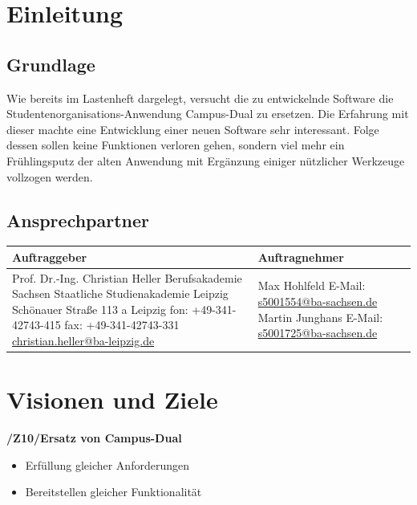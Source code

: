 \documentclass[12pt, a4paper]{scrartcl}
\newcommand{\ford}[2]{\textbf{/#1/\hspace{2em}#2}}
\begin{document}
\section{Einleitung}
\subsection{Grundlage}
Wie bereits im Lastenheft dargelegt, versucht die zu entwickelnde Software die Studentenorganisations-Anwendung Campus-Dual zu ersetzen. Die Erfahrung mit dieser machte eine Entwicklung einer neuen Software sehr interessant. Folge dessen sollen keine Funktionen verloren gehen, sondern viel mehr ein Frühlingsputz der alten Anwendung mit Ergänzung einiger nützlicher Werkzeuge vollzogen werden.

\subsection{Ansprechpartner}
\begin{center}
\begin{tabular}{ |p{7cm}|p{7cm}| } 
 \hline
 Auftraggeber & Auftragnehmer \\\hline
 Prof. Dr.-Ing. Christian Heller\newline
 Berufsakademie Sachsen\newline
 Staatliche Studienakademie Leipzig\newline
 Schönauer Straße 113 a\newline
 04207 Leipzig\newline
 fon: +49-341-42743-415\newline
 fax: +49-341-42743-331\newline
	\href{mailto:christian.heller@ba-leipzig.de}{christian.heller@ba-leipzig.de} &
 Max Hohlfeld\newline
 E-Mail: \href{mailto:s5001554@ba-sachsen.de}{s5001554@ba-sachsen.de}\newline\newline
 Martin Junghans\newline
 E-Mail: \href{mailto:s5001725@ba-sachsen.de}{s5001725@ba-sachsen.de} \\\hline
\end{tabular}
\end{center}
\newpage

\section{Visionen und Ziele}
\ford{Z10}{Ersatz von Campus-Dual}
\begin{itemize}
	\item Erfüllung gleicher Anforderungen
	\item Bereitstellen gleicher Funktionalität
\end{itemize}
\end{document}
